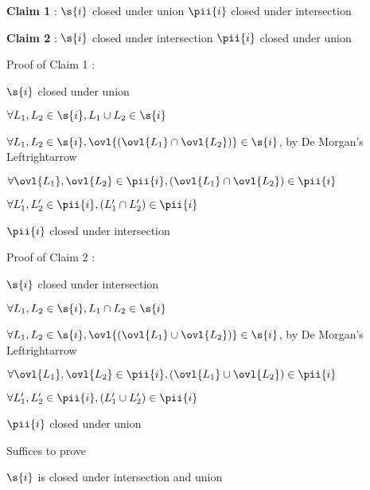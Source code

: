 
\textbf{Claim 1} : $\s{i}$ closed under union \imp
$\pii{i}$ closed under intersection

\textbf{Claim 2} : $\s{i}$ closed under intersection \imp
$\pii{i}$ closed under union

Proof of Claim 1 : 


$\s{i}$ closed under union

\imp
$\forall L_1, L_2 \in \s{i}, L_1 \cup L_2 \in \s{i}$

\imp
$\forall L_1, L_2 \in \s{i}, \ovl{(\ovl{L_1} \cap \ovl{L_2})} \in \s{i}$, by De Morgan's Leftrightarrow

\imp
$\forall \ovl{L_1}, \ovl{L_2} \in \pii{i}, {(\ovl{L_1} \cap \ovl{L_2})} \in \pii{i}$

\imp
$\forall L_1', L_2' \in \pii{i}, {(L_1' \cap L_2')} \in \pii{i}$

\imp
$\pii{i}$ closed under intersection

Proof of Claim 2 : 


$\s{i}$ closed under intersection

\imp
$\forall L_1, L_2 \in \s{i}, L_1 \cap L_2 \in \s{i}$

\imp
$\forall L_1, L_2 \in \s{i}, \ovl{(\ovl{L_1} \cup \ovl{L_2})} \in \s{i}$, by De Morgan's Leftrightarrow

\imp
$\forall \ovl{L_1}, \ovl{L_2} \in \pii{i}, {(\ovl{L_1} \cup \ovl{L_2})} \in \pii{i}$

\imp
$\forall L_1', L_2' \in \pii{i}, {(L_1' \cup L_2')} \in \pii{i}$

\imp
$\pii{i}$ closed under union


Suffices to prove

$\s{i}$ is closed under intersection and union






